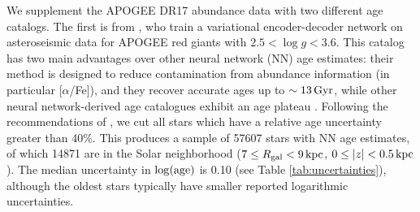 \documentclass[twocolumn,twocolappendix,linenumbers]{aastex631}
\newcommand{\todo}[1]{{\color{red}#1}}
\newcommand{\kpc}{\,{\rm kpc}}
\newcommand{\Gyr}{\,{\rm Gyr}}
\begin{document}
We supplement the APOGEE DR17 abundance data with two different age catalogs. The first is from \citet{leung_variational_2023}, who train a variational encoder-decoder network on asteroseismic data for APOGEE red giants with $2.5<\log g<3.6$. This catalog has two main advantages over other neural network (NN) age estimates: their method is designed to reduce contamination from abundance information (in particular [$\alpha$/Fe]), and they recover accurate ages up to $\sim13\Gyr$, while other neural network-derived age catalogues exhibit an age plateau \citep[e.g.,][]{mackereth_dynamical_2019}. Following the recommendations of \citet{leung_variational_2023}, we cut all stars which have a relative age uncertainty greater than 40\%. This produces a sample of \num{57607} stars with NN age estimates, of which \num{14871} are in the Solar neighborhood ($7\leq R_{\rm gal}<9\kpc$, $0\leq|z|<0.5\kpc$). The median uncertainty in $\log({\rm age})$ is 0.10 (see Table \ref{tab:uncertainties}), although the oldest stars typically have smaller reported logarithmic uncertainties.

\end{document}
